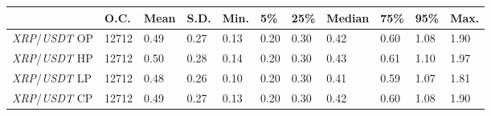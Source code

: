 \begin{tabular}{lllllllllll}
\toprule
 & \textbf{O.C.} & \textbf{Mean} & \textbf{S.D.} & \textbf{Min.} & \textbf{5\%} & \textbf{25\%} & \textbf{Median} & \textbf{75\%} & \textbf{95\%} & \textbf{Max.} \\
\midrule
\emph{XRP}/\emph{USDT} OP & 12712 & 0.49 & 0.27 & 0.13 & 0.20 & 0.30 & 0.42 & 0.60 & 1.08 & 1.90 \\
\emph{XRP}/\emph{USDT} HP & 12712 & 0.50 & 0.28 & 0.14 & 0.20 & 0.30 & 0.43 & 0.61 & 1.10 & 1.97 \\
\emph{XRP}/\emph{USDT} LP & 12712 & 0.48 & 0.26 & 0.10 & 0.20 & 0.30 & 0.41 & 0.59 & 1.07 & 1.81 \\
\emph{XRP}/\emph{USDT} CP & 12712 & 0.49 & 0.27 & 0.13 & 0.20 & 0.30 & 0.42 & 0.60 & 1.08 & 1.90 \\
\bottomrule
\end{tabular}
